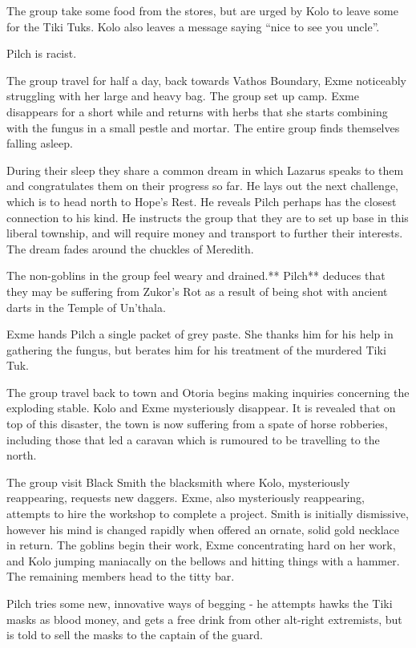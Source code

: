 The group take some food from the stores, but are urged by Kolo to leave some for the Tiki Tuks. Kolo also leaves a message saying “nice to see you uncle”.\medskip

Pilch is racist.\medskip

The group travel for half a day, back towards Vathos Boundary, Exme noticeably struggling with her large and heavy bag. The group set up camp. Exme disappears for a short while and returns with herbs that she starts combining with the fungus in a small pestle and mortar. The entire group finds themselves falling asleep.\medskip

During their sleep they share a common dream in which Lazarus speaks to them and congratulates them on their progress so far. He lays out the next challenge, which is to head north to Hope’s Rest. He reveals Pilch perhaps has the closest connection to his kind. He instructs the group that they are to set up base in this liberal township, and will require money and transport to further their interests. The dream fades around the chuckles of Meredith.\medskip

The non-goblins in the group feel weary and drained.** Pilch** deduces that they may be suffering from Zukor’s Rot as a result of being shot with ancient darts in the Temple of Un'thala.\medskip

Exme hands Pilch a single packet of grey paste. She thanks him for his help in gathering the fungus, but berates him for his treatment of the murdered Tiki Tuk.\medskip

The group travel back to town and Otoria begins making inquiries concerning the exploding stable. Kolo and Exme mysteriously disappear. It is revealed that on top of this disaster, the town is now suffering from a spate of horse robberies, including those that led a caravan which is rumoured to be travelling to the north.\medskip

The group visit Black Smith the blacksmith where Kolo, mysteriously reappearing, requests new daggers. Exme, also mysteriously reappearing, attempts to hire the workshop to complete a project. Smith is initially dismissive, however his mind is changed rapidly when offered an ornate, solid gold necklace in return. The goblins begin their work, Exme concentrating hard on her work, and Kolo jumping maniacally on the bellows and hitting things with a hammer. The remaining members head to the titty bar.\medskip

Pilch tries some new, innovative ways of begging - he attempts hawks the Tiki masks as blood money, and gets a free drink from other alt-right extremists, but is told to sell the masks to the captain of the guard.\medskip

